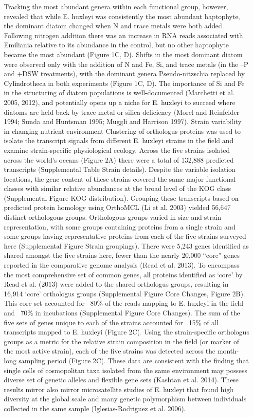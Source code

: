 Tracking the most abundant genera within each functional group, however, revealed that while E. huxleyi was consistently the most abundant haptophyte, the dominant diatom changed when N and trace metals were both added. Following nitrogen addition there was an increase in RNA reads associated with Emiliania relative to its abundance in the control, but no other haptophyte became the most abundant (Figure 1C, D). Shifts in the most dominant diatom were observed only with the addition of N and Fe, Si, and trace metals (in the –P and +DSW treatments), with the dominant genera Pseudo-nitzschia replaced by Cylindrotheca in both experiments (Figure 1C, D). The importance of Si and Fe in the structuring of diatom populations is well-documented (Marchetti et al. 2005, 2012), and potentially opens up a niche for E. huxleyi to succeed where diatoms are held back by trace metal or silica deficiency (Morel and Reinfelder 1994; Sunda and Huntsman 1995; Muggli and Harrison 1997). 
Strain variability in changing nutrient environment
Clustering of orthologus proteins was used to isolate the transcript signals from different E. huxleyi strains in the field and examine strain-specific physiological ecology. Across the five strains isolated across the world’s oceans (Figure 2A) there were a total of 132,888 predicted transcripts (Supplemental Table Strain details). Despite the variable isolation locations, the gene content of these strains covered the same major functional classes with similar relative abundances at the broad level of the KOG class (Supplemental Figure KOG distribution). Grouping these transcripts based on predicted protein homology using OrthoMCL (Li et al. 2003) yielded 56,647 distinct orthologous groups. Orthologous groups varied in size and strain representation, with some groups containing proteins from a single strain and some groups having representative proteins from each of the five strains surveyed here (Supplemental Figure Strain groupings). 
There were 5,243 genes identified as shared amongst the five strains here, fewer than the nearly 20,000 “core” genes reported in the comparative genome analysis (Read et al. 2013). To encompass the most comprehensive set of common genes, all proteins identified as ‘core’ by Read et al. (2013) were added to the shared orthologus groups, resulting in 16,914 ‘core’ orthologus groups (Supplemental Figure Core Changes, Figure 2B). This core set accounted for ~80\% of the reads mapping to E. huxleyi in the field and ~70\% in incubations (Supplemental Figure Core Changes). The sum of the five sets of genes unique to each of the strains accounted for ~15\% of all transcripts mapped to E. huxleyi (Figure 2C). Using the strain-specific orthologus groups as a metric for the relative strain composition in the field (or marker of the most active strain), each of the five strains was detected across the month-long sampling period (Figure 2C).  These data are consistent with the finding that single cells of cosmopolitan taxa isolated from the same environment may possess diverse set of genetic alleles and flexible gene sets (Kashtan et al. 2014). These results mirror also mirror microsatellite studies of E. huxleyi that found high diversity at the global scale and many genetic polymorphism between individuals collected in the same sample (Iglesias-Rodriguez et al. 2006). 
